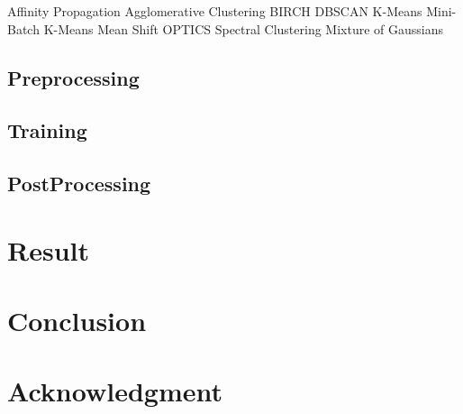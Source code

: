 \documentclass{article}
\begin{document}
Affinity Propagation
Agglomerative Clustering
BIRCH
DBSCAN
K-Means
Mini-Batch K-Means
Mean Shift
OPTICS
Spectral Clustering
Mixture of Gaussians





\subsection{Preprocessing}

\subsection{Training}

\subsection{PostProcessing}


\section{Result}


\section{Conclusion}


\section{Acknowledgment}



 
 
\end{document}
